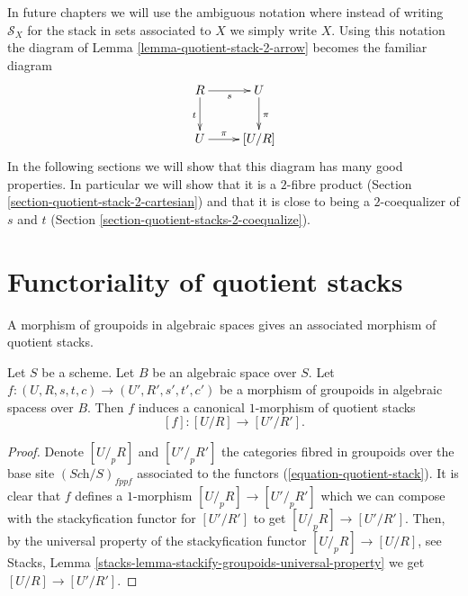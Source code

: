 \begin{remark}
\label{remark-fundamental-square}
In future chapters we will use the ambiguous notation where
instead of writing $\mathcal{S}_X$ for the stack in sets associated
to $X$ we simply write $X$. Using this notation the diagram of
Lemma \ref{lemma-quotient-stack-2-arrow}
becomes the familiar diagram
$$
\xymatrix{
R \ar[r]_s \ar[d]_t & U \ar[d]^\pi \\
U \ar[r]^-\pi & [U/R]
}
$$
In the following sections we will show that this diagram has
many good properties. In particular we will show that it is
a $2$-fibre product
(Section \ref{section-quotient-stack-2-cartesian})
and that it is close to being a $2$-coequalizer of $s$ and $t$
(Section \ref{section-quotient-stacks-2-coequalize}).
\end{remark}




\section{Functoriality of quotient stacks}
\label{section-functoriality-quotient-stacks}

\noindent
A morphism of groupoids in algebraic spaces gives an associated morphism
of quotient stacks.

\begin{lemma}
\label{lemma-quotient-stack-functorial}
Let $S$ be a scheme. Let $B$ be an algebraic space over $S$.
Let $f : (U, R, s, t, c) \to (U', R', s', t', c')$ be a morphism of
groupoids in algebraic spacess over $B$.
Then $f$ induces a canonical $1$-morphism of quotient stacks
$$
[f] : [U/R] \longrightarrow [U'/R'].
$$
\end{lemma}

\begin{proof}
Denote $[U/_{\!p}R]$ and $[U'/_{\!p}R']$ the categories fibred
in groupoids over the base site $(\textit{Sch}/S)_{fppf}$ associated to the
functors (\ref{equation-quotient-stack}). It is clear that $f$ defines
a $1$-morphism $[U/_{\!p}R] \to [U'/_{\!p}R']$ which we can compose
with the stackyfication functor for $[U'/R']$ to get $[U/_{\!p}R] \to [U'/R']$.
Then, by the universal property of the stackyfication functor
$[U/_{\!p}R] \to [U/R]$, see
Stacks, Lemma \ref{stacks-lemma-stackify-groupoids-universal-property}
we get $[U/R] \to [U'/R']$.
\end{proof}

